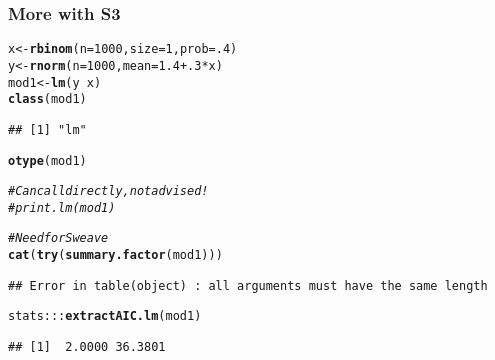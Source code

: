 \documentclass[xcolor=svgnames]{beamer}\usepackage[]{graphicx}\usepackage[]{color}
\makeatletter
\newcommand{\hlnum}[1]{\textcolor[rgb]{0.686,0.059,0.569}{#1}}%
\newcommand{\hlcom}[1]{\textcolor[rgb]{0.678,0.584,0.686}{\textit{#1}}}%
\newcommand{\hlopt}[1]{\textcolor[rgb]{0,0,0}{#1}}%
\newcommand{\hlstd}[1]{\textcolor[rgb]{0.345,0.345,0.345}{#1}}%
\newcommand{\hlkwb}[1]{\textcolor[rgb]{0.69,0.353,0.396}{#1}}%
\newcommand{\hlkwc}[1]{\textcolor[rgb]{0.333,0.667,0.333}{#1}}%
\newcommand{\hlkwd}[1]{\textcolor[rgb]{0.737,0.353,0.396}{\textbf{#1}}}%
\newenvironment{kframe}{%
 \def\at@end@of@kframe{}%
 \ifinner\ifhmode%
  \def\at@end@of@kframe{\end{minipage}}%
  \begin{minipage}{\columnwidth}%
 \fi\fi%
 \def\FrameCommand##1{\hskip\@totalleftmargin \hskip-\fboxsep
 \colorbox{shadecolor}{##1}\hskip-\fboxsep
     \hskip-\linewidth \hskip-\@totalleftmargin \hskip\columnwidth}%
 \MakeFramed {\advance\hsize-\width
   \@totalleftmargin\z@ \linewidth\hsize
   \@setminipage}}%
 {\par\unskip\endMakeFramed%
 \at@end@of@kframe}
\newenvironment{knitrout}{}{} %
\makeatother
\begin{document}
\begin{frame}[fragile]
  \frametitle{More with S3}
\begin{knitrout}
\color{fgcolor}\begin{kframe}


{\ttfamily\noindent\bfseries\color{errorcolor}{\#\# Error in library(pryr): there is no package called 'pryr'}}\end{kframe}
\end{knitrout}
\begin{tiny}

\begin{knitrout}
\color{fgcolor}\begin{kframe}
\begin{alltt}
\hlstd{x} \hlkwb{<-} \hlkwd{rbinom}\hlstd{(}\hlkwc{n} \hlstd{=} \hlnum{1000}\hlstd{,} \hlkwc{size} \hlstd{=} \hlnum{1}\hlstd{,} \hlkwc{prob} \hlstd{=} \hlnum{.4}\hlstd{)}
\hlstd{y} \hlkwb{<-} \hlkwd{rnorm}\hlstd{(}\hlkwc{n}\hlstd{=} \hlnum{1000}\hlstd{,}\hlkwc{mean}\hlstd{=}\hlnum{1.4} \hlopt{+} \hlnum{.3}\hlopt{*}\hlstd{x)}
\hlstd{mod1} \hlkwb{<-} \hlkwd{lm}\hlstd{(y}\hlopt{~}\hlstd{x)}
\hlkwd{class}\hlstd{(mod1)}
\end{alltt}
\begin{verbatim}
## [1] "lm"
\end{verbatim}
\begin{alltt}
\hlkwd{otype}\hlstd{(mod1)}
\end{alltt}


{\ttfamily\noindent\bfseries{}}\begin{alltt}
\hlcom{# Can call directly, not advised!}
\hlcom{# print.lm(mod1)}

\hlcom{# Need for Sweave}
\hlkwd{cat}\hlstd{(}\hlkwd{try}\hlstd{(}\hlkwd{summary.factor}\hlstd{(mod1)))}
\end{alltt}
\begin{verbatim}
## Error in table(object) : all arguments must have the same length
\end{verbatim}
\begin{alltt}
\hlstd{stats}\hlopt{:::}\hlkwd{extractAIC.lm}\hlstd{(mod1)}
\end{alltt}
\begin{verbatim}
## [1]  2.0000 36.3801
\end{verbatim}
\end{kframe}
\end{knitrout}
\end{tiny}
\end{frame}
\end{document}
